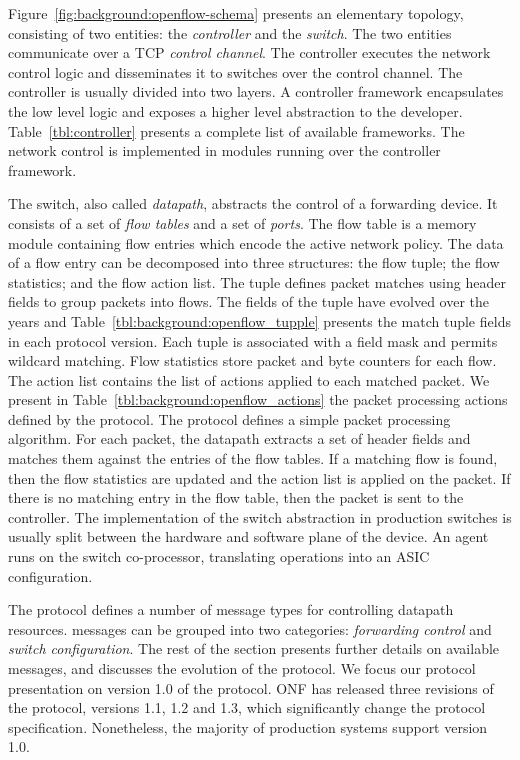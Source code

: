Figure~\ref{fig:background:openflow-schema} presents an elementary \of topology,
consisting of two entities: the \textit{controller} and the \textit{switch}. The
two entities communicate over a TCP \textit{control channel}.  The \of controller
executes the network control logic and disseminates it to switches over
the control channel. The controller is usually divided into two layers. A controller
framework encapsulates the low level \of logic and exposes a higher
level abstraction to the developer.  Table~\ref{tbl:controller} presents a
complete list of available \of frameworks.  The network control is
implemented in modules running over the controller framework. 


The \of switch, also called \textit{datapath}, abstracts the control of a
forwarding device. It consists of a set of \textit{flow tables}
and a set of \textit{ports}. The flow table is a memory module containing flow
entries which encode the active network policy. The data of a flow entry can be
decomposed into three structures: the flow tuple; the flow statistics; and the flow
action list.  The tuple defines packet matches using header fields to group packets into
flows.  The fields of the tuple have evolved over the years and
Table~\ref{tbl:background:openflow_tupple} presents the match tuple fields
in each protocol version. Each tuple is associated with a field mask and permits
wildcard matching.  Flow statistics store packet and byte counters for each
flow. The action list contains the list of actions applied to each matched
packet.  We present in Table~\ref{tbl:background:openflow_actions} the packet
processing actions defined by the \of protocol.  The protocol defines a simple
packet processing algorithm.  For each packet, the datapath extracts a set
of header fields and matches them against the entries of the flow tables.  If a
matching flow is found, then the flow statistics are updated and the action list
is applied on the packet. If there is no matching entry in the flow table, then
the packet is sent to the controller. The implementation of the \of switch
abstraction in production switches is usually split between the hardware and
software plane of the device. An \of agent runs on the switch co-processor,
translating \of operations into an ASIC configuration.  

The protocol defines a number of message types for controlling datapath resources.
\of messages can be grouped into two categories: \emph{forwarding control} and
\emph{switch configuration}. The rest of the section presents further details on
available \of messages, and discusses the evolution of the protocol.  We focus
our protocol presentation on version 1.0 of the protocol.  ONF has released
three revisions of the protocol, versions 1.1, 1.2 and 1.3, which
significantly change the protocol specification. Nonetheless, the majority of
production systems support version 1.0.

